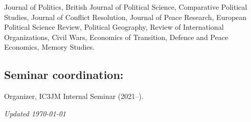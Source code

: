 \documentclass[a4paper, 12pt]{article}
\begin{document}
Journal of Politics, British Journal of Political Science, Comparative Political Studies, Journal of Conflict Resolution, Journal of Peace Research, European Political Science Review, Political Geography, Review of International Organizations, Civil Wars, Economics of Transition, Defence and Peace Economics, Memory Studies.

\subsection*{Seminar coordination:}

Organizer, IC3JM Internal Seminar (2021--).


%

%
%
%

\vfill

\noindent
\flushright
{\small\it Updated \monthdate\today}
\end{document}
